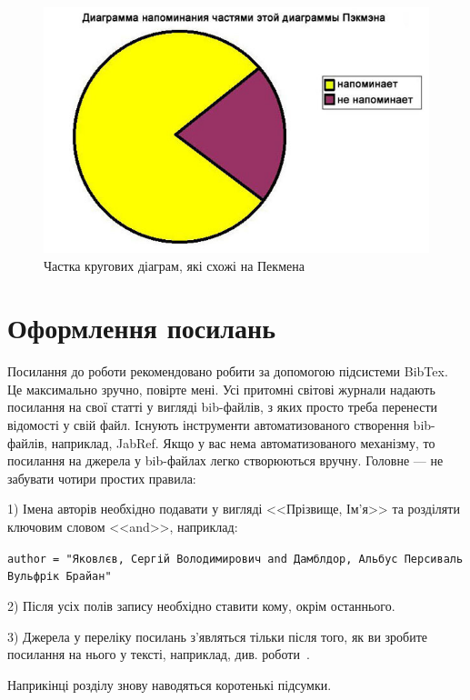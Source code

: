 \begin{figure}[ht]
        \centering
        \includegraphics[scale=0.5]{Images/Pacman.jpg}
        \caption{Частка кругових діаграм, які схожі на Пекмена}
        \label{fig_pacman}
\end{figure}

\section{Оформлення посилань}

Посилання до роботи рекомендовано робити за допомогою підсистеми BibTex. 
Це максимально зручно, повірте мені. Усі притомні світові журнали надають 
посилання на свої статті у вигляді bib-файлів, з яких просто треба 
перенести відомості у свій файл. Існують інструменти автоматизованого створення bib-файлів, наприклад, JabRef.
Якщо у вас нема автоматизованого механізму, то посилання на джерела у 
bib-файлах легко створюються вручну. Головне --- не забувати чотири простих 
правила:

1) Імена авторів необхідно подавати у вигляді <<Прізвище, Ім'я>> та 
розділяти ключовим словом <<and>>, наприклад:

\texttt{author = "Яковлєв, Сергій Володимирович and Дамблдор, Альбус Персиваль Вульфрік Брайан"}

2) Після усіх полів запису необхідно ставити кому, окрім останнього.

3) Джерела у переліку посилань з'являться тільки після того, як ви зробите 
посилання на нього у тексті, наприклад, див. роботи~\cite{ct1, ct2}.



\chapconclude{\ref{chap:theory}}

Наприкінці розділу знову наводяться коротенькі підсумки.